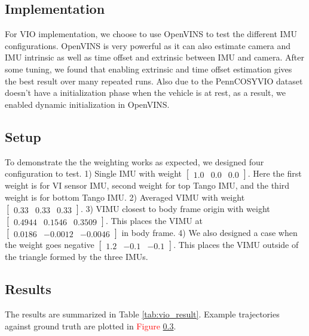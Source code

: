 \documentclass[conference]{IEEEtran}
\begin{document}
\subsection{Implementation}

For VIO implementation, we choose to use OpenVINS \cite{openvins} to test the different IMU configurations. OpenVINS is very powerful as it can also estimate camera and IMU intrinsic as well as time offset and extrinsic between IMU and camera. After some tuning, we found that enabling extrinsic and time offset estimation gives the best result over many repeated runs. Also due to the PennCOSYVIO dataset doesn't have a initialization phase when the vehicle is at rest, as a result, we enabled dynamic initialization in OpenVINS.

\subsection{Setup}

To demonstrate the the weighting works as expected, we designed four configuration to test. 1) Single IMU with weight $[\begin{matrix} 1.0 & 0.0 & 0.0 \end{matrix}]$. Here the first weight is for VI sensor IMU, second weight for top Tango IMU, and the third weight is for bottom Tango IMU. 2) Averaged VIMU with weight $[\begin{matrix} 0.33 & 0.33 & 0.33 \end{matrix}]$. 3) VIMU closest to body frame origin with weight $[\begin{matrix} 0.4944 & 0.1546 & 0.3509 \end{matrix}]$. This places the VIMU at $[\begin{matrix} 0.0186 & -0.0012 & -0.0046 \end{matrix}]$ in body frame. 4) We also designed a case when the weight goes negative $[\begin{matrix} 1.2 & -0.1 & -0.1 \end{matrix}]$. This places the VIMU outside of the triangle formed by the three IMUs.

\subsection{Results}

The results are summarized in Table \ref{tab:vio_result}. Example trajectories against ground truth are plotted in \textcolor{red}{Figure} \ref{}.
\end{document}
